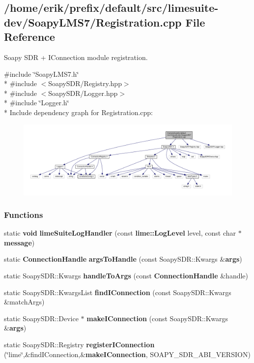 \subsection{/home/erik/prefix/default/src/limesuite-\/dev/\+Soapy\+L\+M\+S7/\+Registration.cpp File Reference}
\label{Registration_8cpp}


Soapy S\+DR + I\+Connection module registration.  


{\ttfamily \#include \char`\"{}Soapy\+L\+M\+S7.\+h\char`\"{}}\\*
{\ttfamily \#include $<$Soapy\+S\+D\+R/\+Registry.\+hpp$>$}\\*
{\ttfamily \#include $<$Soapy\+S\+D\+R/\+Logger.\+hpp$>$}\\*
{\ttfamily \#include \char`\"{}Logger.\+h\char`\"{}}\\*
Include dependency graph for Registration.\+cpp\+:
\nopagebreak
\begin{figure}[H]
\begin{center}
\leavevmode
\includegraphics[width=350pt]{d1/d0d/Registration_8cpp__incl}
\end{center}
\end{figure}
\subsubsection*{Functions}
\begin{DoxyCompactItemize}
\item 
static {\bf void} {\bf lime\+Suite\+Log\+Handler} (const {\bf lime\+::\+Log\+Level} level, const char $\ast${\bf message})
\item 
static {\bf Connection\+Handle} {\bf args\+To\+Handle} (const Soapy\+S\+D\+R\+::\+Kwargs \&{\bf args})
\item 
static Soapy\+S\+D\+R\+::\+Kwargs {\bf handle\+To\+Args} (const {\bf Connection\+Handle} \&handle)
\item 
static Soapy\+S\+D\+R\+::\+Kwargs\+List {\bf find\+I\+Connection} (const Soapy\+S\+D\+R\+::\+Kwargs \&match\+Args)
\item 
static Soapy\+S\+D\+R\+::\+Device $\ast$ {\bf make\+I\+Connection} (const Soapy\+S\+D\+R\+::\+Kwargs \&{\bf args})
\item 
static Soapy\+S\+D\+R\+::\+Registry {\bf register\+I\+Connection} (\char`\"{}lime\char`\"{},\&find\+I\+Connection,\&{\bf make\+I\+Connection}, S\+O\+A\+P\+Y\+\_\+\+S\+D\+R\+\_\+\+A\+B\+I\+\_\+\+V\+E\+R\+S\+I\+ON)
\end{DoxyCompactItemize}


